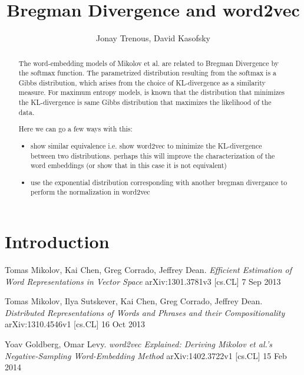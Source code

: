 \documentclass[]{article}
\title{Bregman Divergence and word2vec}
\author{Jonay Trenous, David Kasofsky}
\begin{document}
\maketitle

\begin{abstract}

\noindent The word-embedding models of Mikolov et al.\cite{word2vec1}\cite{word2vec2} are related to Bregman Divergence by the softmax function. The parametrized distribution resulting from the softmax is a Gibbs distribution, which arises from the choice of KL-divergence as a similarity measure. For maximum entropy models, is known that the distribution that minimizes the KL-divergence is same Gibbs distribution that maximizes the likelihood of the data.

Here we can go a few ways with this:


\begin{itemize}
	\item show similar equivalence i.e. show word2vec to minimize the KL-divergence between two distributions. perhaps this will improve the characterization of the word embeddings (or show that in this case it is not equivalent)
	\item use the exponential distribution corresponding with another bregman divergance to perform the normalization in word2vec
\end{itemize}

\end{abstract}

\section{Introduction}



\begin{thebibliography}{1}
 Tomas Mikolov, Kai Chen, Greg Corrado, Jeffrey Dean. {\em Efficient Estimation of Word Representations in Vector Space} arXiv:1301.3781v3 [cs.CL] 7 Sep 2013

 Tomas Mikolov, Ilya Sutskever, Kai Chen, Greg Corrado, Jeffrey Dean. {\em Distributed Representations of Words and Phrases and their Compositionality} arXiv:1310.4546v1  [cs.CL]  16 Oct 2013

 Yoav Goldberg, Omar Levy. {\em word2vec Explained: Deriving Mikolov et al.'s Negative-Sampling Word-Embedding Method} arXiv:1402.3722v1  [cs.CL]  15 Feb 2014

\end{thebibliography}
\end{document}

